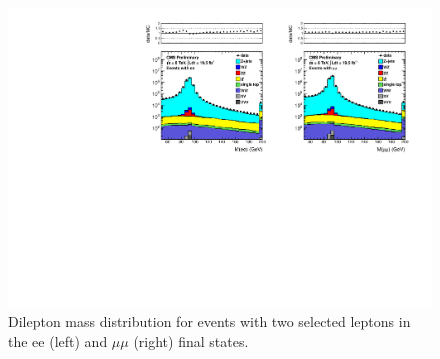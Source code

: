 \begin{figure}[hbt]
  \begin{center}
	\includegraphics[width=1.0\linewidth]{plots/dilmass_19p5fb.pdf}
	\caption{
	  \label{fig:dilmass}\protect 
	  Dilepton mass distribution for events with two selected leptons
	  in the ee (left) and $\mu\mu$ (right) final states.}


  \end{center}
\end{figure}


